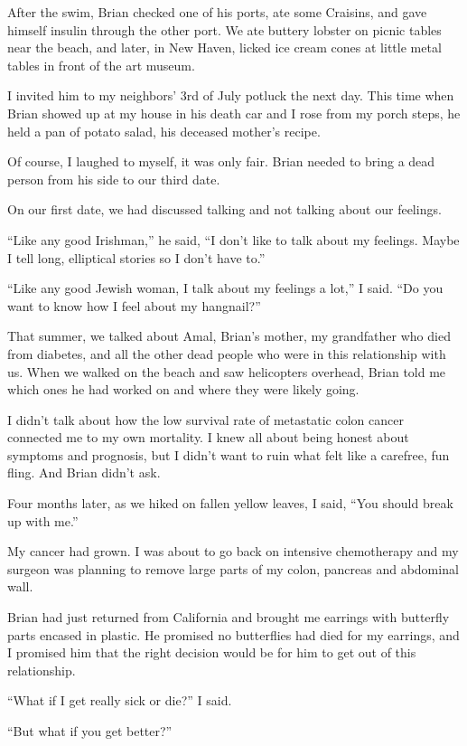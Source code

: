 After the swim, Brian checked one of his ports, ate some Craisins, and
gave himself insulin through the other port. We ate buttery lobster on
picnic tables near the beach, and later, in New Haven, licked ice cream
cones at little metal tables in front of the art museum.

I invited him to my neighbors' 3rd of July potluck the next day. This
time when Brian showed up at my house in his death car and I rose from
my porch steps, he held a pan of potato salad, his deceased mother's
recipe.

Of course, I laughed to myself, it was only fair. Brian needed to bring
a dead person from his side to our third date.

On our first date, we had discussed talking and not talking about our
feelings.

``Like any good Irishman,'' he said, ``I don't like to talk about my
feelings. Maybe I tell long, elliptical stories so I don't have to.''

``Like any good Jewish woman, I talk about my feelings a lot,'' I said.
``Do you want to know how I feel about my hangnail?''

That summer, we talked about Amal, Brian's mother, my grandfather who
died from diabetes, and all the other dead people who were in this
relationship with us. When we walked on the beach and saw helicopters
overhead, Brian told me which ones he had worked on and where they were
likely going.

I didn't talk about how the low survival rate of metastatic colon cancer
connected me to my own mortality. I knew all about being honest about
symptoms and prognosis, but I didn't want to ruin what felt like a
carefree, fun fling. And Brian didn't ask.

Four months later, as we hiked on fallen yellow leaves, I said, ``You
should break up with me.''

My cancer had grown. I was about to go back on intensive chemotherapy
and my surgeon was planning to remove large parts of my colon, pancreas
and abdominal wall.

Brian had just returned from California and brought me earrings with
butterfly parts encased in plastic. He promised no butterflies had died
for my earrings, and I promised him that the right decision would be for
him to get out of this relationship.

``What if I get really sick or die?'' I said.

``But what if you get better?''

